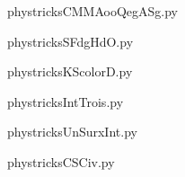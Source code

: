     \newcommand{\CaptionFigCMMAooQegASg}{<+Type your caption here+>}
    \begin{center}
        
    \end{center}
    phystricksCMMAooQegASg.py

    

    \clearpage
    


    \newcommand{\CaptionFigSFdgHdO}{<+Type your caption here+>}
    \begin{center}
        
    \end{center}
    phystricksSFdgHdO.py

    

    \clearpage
    


    \newcommand{\CaptionFigKScolorD}{<+Type your caption here+>}
    \begin{center}
        
    \end{center}
    phystricksKScolorD.py

    

    \clearpage
    


    \newcommand{\CaptionFigIntTrois}{<+Type your caption here+>}
    \begin{center}
        
    \end{center}
    phystricksIntTrois.py

    

    \clearpage
    


    \newcommand{\CaptionFigUnSurxInt}{<+Type your caption here+>}
    \begin{center}
        
    \end{center}
    phystricksUnSurxInt.py

    

    \clearpage
    


    \newcommand{\CaptionFigCSCiv}{<+Type your caption here+>}
    \begin{center}
        
    \end{center}
    phystricksCSCiv.py

